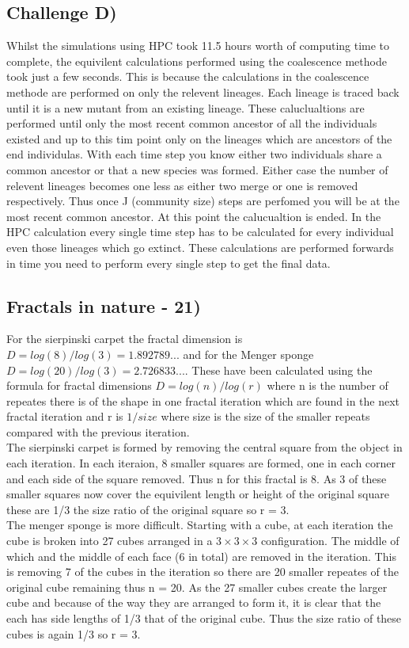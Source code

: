 \documentclass[11pt]{article}
\begin{document}
\subsection*{Challenge D)}
Whilst the simulations using HPC took 11.5 hours worth of computing time to complete, the equivilent calculations performed using the coalescence methode took just a few seconds. This is because the calculations in the coalescence methode are performed on only the relevent lineages. Each lineage is traced back until it is a new mutant from an existing lineage. These caluclualtions are performed until only the most recent common ancestor of all the individuals existed and up to this tim point only on the lineages which are ancestors of the end individulas. With each time step you know either two individuals share a common ancestor or that a new species was formed. Either case the number of relevent lineages becomes one less as either two merge or one is removed respectively. Thus once J (community size) steps are perfomed you will be at the most recent common ancestor. At this point the calucualtion is ended. In the HPC calculation every single time step has to be calculated for every individual even those lineages which go extinct. These calculations are performed forwards in time you need to perform every single step to get the final data. 
\subsection*{Fractals in nature - 21)}
For the sierpinski carpet the fractal dimension is $D=log(8)/log(3) = 1.892789...$ and for the Menger sponge $D=log(20)/log(3) = 2.726833...$. These have been calculated using the formula for fractal dimensions $D=log(n)/log(r)$ where n is the number of repeates there is of the shape in one fractal iteration which are found in the next fractal iteration and r is $1/size$ where size is the size of the smaller repeats compared with the previous iteration.\\
The sierpinski carpet is formed by removing the central square from the object in each iteration. In each iteraion, 8 smaller squares are formed, one in each corner and each side of the square removed. Thus n for this fractal is 8. As 3 of these smaller squares now cover the equivilent length or height of the original square these are 1/3 the size ratio of the original square so r = 3.\\
The menger sponge is more difficult. Starting with a cube, at each iteration the cube is broken into 27 cubes arranged in a $3 \times 3 \times 3$ configuration. The middle of which and the middle of each face (6 in total) are removed in the iteration. This is removing 7 of the cubes in the iteration so there are 20 smaller repeates of the original cube remaining thus n = 20. As the 27 smaller cubes create the larger cube and because of the way they are arranged to form it, it is clear that the each has side lengths of 1/3 that of the original cube. Thus the size ratio of these cubes is again 1/3 so r = 3.\\
\end{document}

